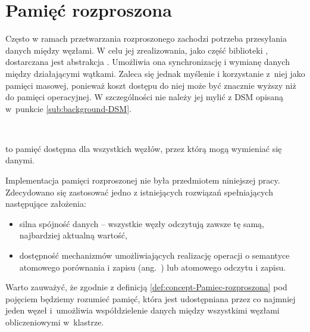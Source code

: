 \section{Pamięć rozproszona}

\label{sec:concept-Rozproszona-pami=000119=000107-wsp=0000F3=000142dzielona}Często
w ramach przetwarzania rozproszonego zachodzi potrzeba przesyłania
danych między węzłami. W celu jej zrealizowania, jako część biblioteki
, dostarczana jest abstrakcja .
Umożliwia ona synchronizację i wymianę danych między działającymi
wątkami. Zaleca się jednak myślenie i korzystanie z~niej jako pamięci
masowej, ponieważ koszt dostępu do niej może być znacznie wyższy niż
do pamięci operacyjnej. W szczególności nie należy jej mylić z DSM
opisaną w~punkcie \ref{sub:background-DSM}.
\begin{defn}
~

\noindent \label{def:concept-Pamiec-rozproszona}
to pamięć dostępna dla wszystkich węzłów, przez którą mogą wymieniać
się danymi.
\end{defn}
Implementacja pamięci rozproszonej nie była przedmiotem niniejszej
pracy. Zdecydowano się zastosować jedno z istniejących rozwiązań spełniających
następujące założenia:
\begin{itemize}
\item silna spójność danych -- wszystkie węzły odczytują zawsze tę samą,
najbardziej aktualną wartość,
\item dostępność mechanizmów umożliwiających realizację operacji o semantyce
atomowego porównania i zapisu (ang.~) lub
atomowego odczytu i zapisu.
\end{itemize}
Warto zauważyć, że zgodnie z definicją \ref{def:concept-Pamiec-rozproszona}
pod pojęciem  będziemy rozumieć pamięć,
która jest udostępniana przez co najmniej jeden węzeł i~umożliwia
współdzielenie danych między wszystkimi węzłami obliczeniowymi w~klastrze.

